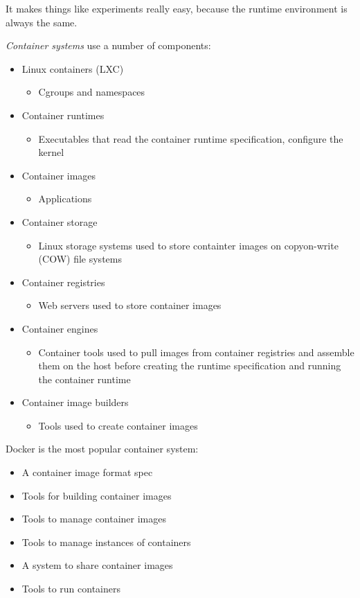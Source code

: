 \documentclass[11pt,a4paper,titlepage,dvipsnames,cmyk]{scrartcl}
\begin{document}
It makes things like experiments really easy, because the runtime environment is always the same.

\textit{Container systems} use a number of components:
\begin{itemize}
    \item Linux containers (LXC)
    \begin{itemize}
        \item Cgroups and namespaces
    \end{itemize}
    \item Container runtimes
    \begin{itemize}
        \item Executables that read the container runtime specification, configure the kernel
    \end{itemize}
    \item Container images
    \begin{itemize}
        \item Applications
    \end{itemize}
    \item Container storage
    \begin{itemize}
        \item Linux storage systems used to store containter images on copyon-write (COW) file systems
    \end{itemize}
    \item Container registries
    \begin{itemize}
        \item Web servers used to store container images
    \end{itemize}
    \item Container engines
    \begin{itemize}
        \item Container tools used to pull images from container registries and assemble them on the host before creating the runtime specification and running the container runtime
    \end{itemize}
    \item Container image builders
    \begin{itemize}
        \item Tools used to create container images
    \end{itemize}
\end{itemize}

Docker is the most popular container system:
\begin{itemize}
    \item A container image format spec
    \item Tools for building container images
    \item Tools to manage container images
    \item Tools to manage instances of containers
    \item A system to share container images
    \item Tools to run containers
\end{itemize}
\end{document}
